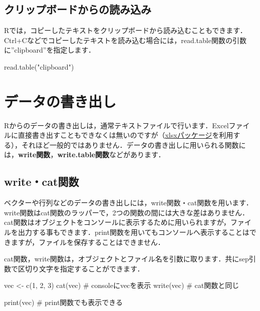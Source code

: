 \documentclass[
  letterpaper,
  DIV=11,
  numbers=noendperiod]{scrreprt}
\newenvironment{Shaded}{\begin{snugshade}}{\end{snugshade}}
\newcommand{\CommentTok}[1]{\textcolor[rgb]{0.37,0.37,0.37}{#1}}
\newcommand{\DecValTok}[1]{\textcolor[rgb]{0.68,0.00,0.00}{#1}}
\newcommand{\FunctionTok}[1]{\textcolor[rgb]{0.28,0.35,0.67}{#1}}
\newcommand{\NormalTok}[1]{\textcolor[rgb]{0.00,0.23,0.31}{#1}}
\newcommand{\OtherTok}[1]{\textcolor[rgb]{0.00,0.23,0.31}{#1}}
\newcommand{\StringTok}[1]{\textcolor[rgb]{0.13,0.47,0.30}{#1}}
\begin{document}
\hypertarget{ux30afux30eaux30c3ux30d7ux30dcux30fcux30c9ux304bux3089ux306eux8aadux307fux8fbcux307f}{%
\subsection{クリップボードからの読み込み}\label{ux30afux30eaux30c3ux30d7ux30dcux30fcux30c9ux304bux3089ux306eux8aadux307fux8fbcux307f}}

Rでは，コピーしたテキストをクリップボードから読み込むこともできます．Ctrl+Cなどでコピーしたテキストを読み込む場合には，read.table関数の引数に''clipboard''を指定します．

\begin{Shaded}
\begin{Highlighting}[]
\FunctionTok{read.table}\NormalTok{(}\StringTok{"clipboard"}\NormalTok{)}
\end{Highlighting}
\end{Shaded}

\hypertarget{ux30c7ux30fcux30bfux306eux66f8ux304dux51faux3057}{%
\section{データの書き出し}\label{ux30c7ux30fcux30bfux306eux66f8ux304dux51faux3057}}

Rからのデータの書き出しは，通常テキストファイルで行います．Excelファイルに直接書き出すこともできなくは無いのですが（\href{https://cran.r-project.org/web/packages/xlsx/index.html}{xlsxパッケージ}を利用する），それほど一般的ではありません．データの書き出しに用いられる関数には，\textbf{write関数}，\textbf{write.table関数}などがあります．

\hypertarget{writecatux95a2ux6570}{%
\subsection{write・cat関数}\label{writecatux95a2ux6570}}

ベクターや行列などのデータの書き出しには，write関数・cat関数を用います．write関数はcat関数のラッパーで，2つの関数の間には大きな差はありません．cat関数はオブジェクトをコンソールに表示するために用いられますが，ファイルを出力する事もできます．print関数を用いてもコンソールへ表示することはできますが，ファイルを保存することはできません．

cat関数，write関数は，オブジェクトとファイル名を引数に取ります．共にsep引数で区切り文字を指定することができます．

\begin{Shaded}
\begin{Highlighting}[]
\NormalTok{vec }\OtherTok{\textless{}{-}} \FunctionTok{c}\NormalTok{(}\DecValTok{1}\NormalTok{, }\DecValTok{2}\NormalTok{, }\DecValTok{3}\NormalTok{)}
\FunctionTok{cat}\NormalTok{(vec) }\CommentTok{\# consoleにvecを表示}
\FunctionTok{write}\NormalTok{(vec) }\CommentTok{\# cat関数と同じ}

\FunctionTok{print}\NormalTok{(vec) }\CommentTok{\# print関数でも表示できる}
\end{Highlighting}
\end{Shaded}
\end{document}
